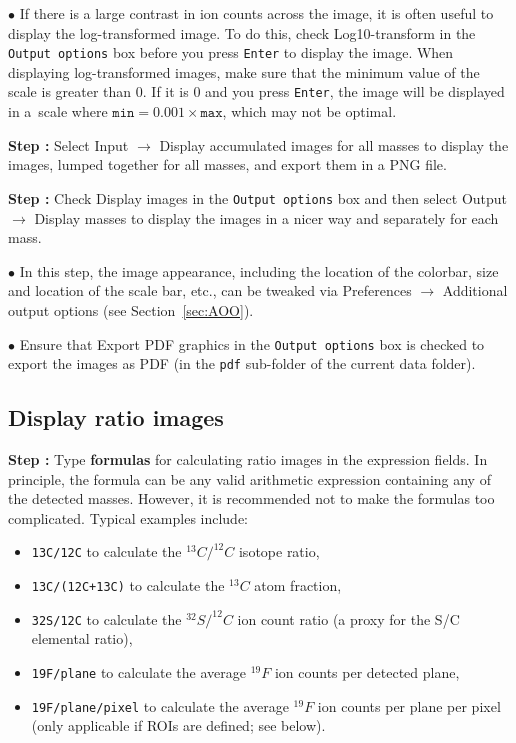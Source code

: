 \documentclass[a4paper, 11pt]{article}
\newcommand{\ttt}[1]{\texttt{#1}}
\newcommand{\lans}[1]{{\color{magenta}#1}}
\newcommand{\lanscb}[1]{{\color{darkgreen}#1}}
\newcommand{\lanstf}[1]{{\color{cyan}#1}}
\newcommand\ra{\rightarrow}
\newcounter{step}
\newcommand\s{\addtocounter{step}{1}\noindent\textbf{Step \thestep:}{ }}
\newcommand\bul{\noindent$\bullet${ }}
\newcommand\bb[1]{\textbf{#1}}
\begin{document}
\bul If there is a large contrast in ion counts across the image, it is often useful to display the log-transformed image. To do this, check \lanscb{Log10-transform} in the \ttt{Output options} box before you press \ttt{Enter} to display the image. When displaying log-transformed images, make sure that the minimum value of the \lanstf{scale} is greater than 0. If it is 0 and you press \ttt{Enter}, the image will be displayed in a~scale where $\ttt{min} = 0.001\times\ttt{max}$, which may not be optimal.

\s Select \lans{Input} $\ra$ \lans{Display accumulated images for all masses} to display the images, lumped together for all masses, and
export them in a PNG file.

\s Check \lanscb{Display images} in the \ttt{Output options} box and then select \lans{Output} $\ra$ \lans{Display masses} to display the images in a nicer way and separately for each mass. 

\bul In this step, the image appearance, including the location of the colorbar, size and location of the scale bar, etc., can be tweaked via \lans{Preferences} $\ra$ \lans{Additional output options} (see Section~\ref{sec:AOO}). 

\bul Ensure that \lanscb{Export PDF graphics} in the \ttt{Output options} box is checked to export the images as PDF (in the \ttt{pdf} sub-folder of the current data folder).


\subsection{Display ratio images}
\setcounter{step}{0}

\s Type \bb{formulas} for calculating ratio images in the  \lanstf{expression} fields. In principle, the formula can be any valid arithmetic expression containing any of the detected masses. However, it is recommended not to make the formulas too complicated. Typical examples include:

\begin{itemize}
\item \ttt{13C/12C} to calculate the $^{13}C/^{12}C$ isotope ratio,
\item \ttt{13C/(12C+13C)} to calculate the $^{13}C$ atom fraction,
\item \ttt{32S/12C} to calculate the $^{32}S/^{12}C$ ion count ratio (a proxy for the S/C elemental ratio), 
\item \ttt{19F/plane} to calculate the average $^{19}F$ ion counts per detected plane, 
\item \ttt{19F/plane/pixel} to calculate the average $^{19}F$ ion counts per plane per pixel (only applicable if ROIs are defined; see below).
\end{itemize}
\end{document}
